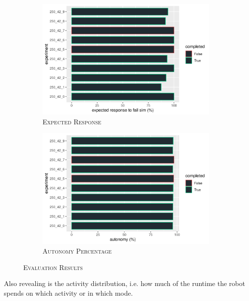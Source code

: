 \documentclass[english, master, utf8]{base/thesis_KBS}
\begin{document}
\begin{figure}[H]
    \centering
    \begin{subfigure}[b]{0.49\textwidth}
        \centering
        \includegraphics[width=\textwidth]{pics/expected_res.png}
        \caption{\textsc{Expected Response}}
        \label{fig:expected_res}
    \end{subfigure}
    \hfill
    \begin{subfigure}[b]{0.49\textwidth}
        \centering
        \includegraphics[width=\textwidth]{pics/autonomy_percentage.png}
        \caption{\textsc{Autonomy Percentage}}
        \label{fig:autonomy_percentage}
    \end{subfigure}
\caption{\textsc{Evaluation Results}}
\label{fig:evaluation_res}
\end{figure}
Also revealing is the activity distribution, i.e. how much of the runtime the robot spends on which activity or in which mode.
\end{document}
